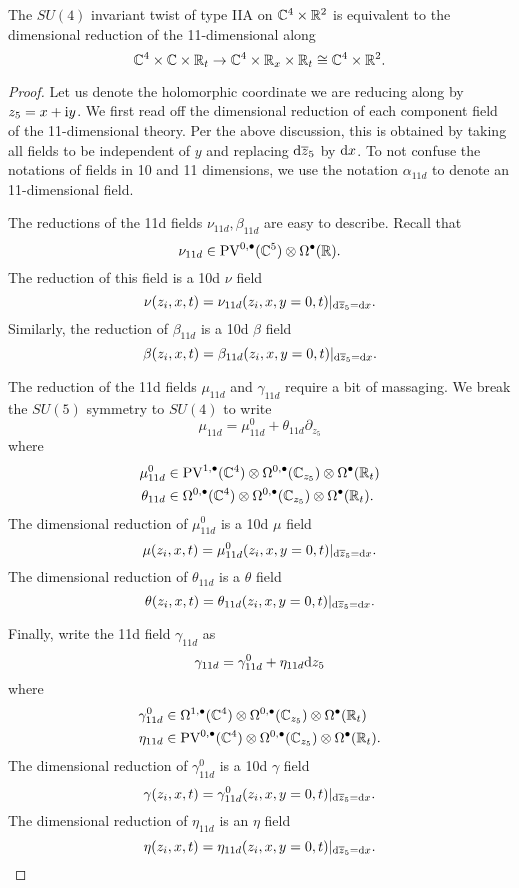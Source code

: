 \begin{prop}\label{prop:dimred}
The $SU(4)$ invariant twist of type IIA on $\mathbb C^4 \times \mathbb R^2$ is equivalent to the dimensional reduction of the 11-dimensional along  
\[
\mathbb C^4 \times \mathbb C \times \mathbb R_t \to \mathbb C^4 \times \mathbb R_x \times \mathbb R_t \cong \mathbb C^4 \times \mathbb R^2 .
\]
\end{prop}
\begin{proof}
Let us denote the holomorphic coordinate we are reducing along by $z_5 = x + {\rm i} y$. 
We first read off the dimensional reduction of each component field of the 11-dimensional theory. 
Per the above discussion, this is obtained by taking all fields to be independent of $y$ and replacing ${\rm d} \overline{z}_5$ by ${\rm d} x$. 
To not confuse the notations of fields in 10 and 11 dimensions, we use the notation $\alpha_{11d}$ to denote an 11-dimensional field.

The reductions of the 11d fields $\nu_{11d}, \beta_{11d}$ are easy to describe. 
Recall that 
\[
\nu_{11d} \in {\rm PV}^{0,\bullet}(\mathbb C^5) \otimes \Omega^\bullet(\mathbb R) .
\]
The reduction of this field is a 10d $\nu$ field
\[
\nu (z_i,x,t) = \nu_{11d} (z_i, x, y=0, t) |_{{\rm d} \overline{z}_5 = {\rm d} x}  .
\]
Similarly, the reduction of $\beta_{11d}$ is a 10d $\beta$ field
\[
\beta (z_i,x,t) = \beta_{11d} (z_i, x, y=0, t) |_{{\rm d} \overline{z}_5 = {\rm d} x}  .
\]

The reduction of the 11d fields $\mu_{11d}$ and $\gamma_{11d}$ require a bit of massaging. 
We break the $SU(5)$ symmetry to $SU(4)$ to write
\[
\mu_{11d} = \mu^0_{11d} + \theta_{11d} \partial_{z_5} 
\]
where
\begin{align*}
\mu^0_{11d} & \in {\rm PV}^{1,\bullet}(\mathbb C^4) \otimes \Omega^{0,\bullet}(\mathbb C_{z_5}) \otimes \Omega^\bullet(\mathbb R_t) \\
\theta_{11d} & \in \Omega^{0,\bullet}(\mathbb C^4) \otimes \Omega^{0,\bullet}(\mathbb C_{z_5}) \otimes \Omega^\bullet(\mathbb R_t) .
\end{align*}
The dimensional reduction of $\mu^0_{11d}$ is a 10d $\mu$ field
\[
\mu(z_i,x,t) = \mu_{11d}^0 (z_i, x,y=0,t)|_{{\rm d} \overline{z}_5 = {\rm d} x} .
\]
The dimensional reduction of $\theta_{11d}$ is a $\theta$ field
\[
\theta(z_i,x,t) = \theta_{11d} (z_i, x,y=0,t)|_{{\rm d} \overline{z}_5 = {\rm d} x} .
\]

Finally, write the 11d field $\gamma_{11d}$ as
\[
\gamma_{11d} = \gamma_{11d}^0 + \eta_{11d} {\rm d} z_5
\]
where
\begin{align*}
\gamma^0_{11d} & \in \Omega^{1,\bullet}(\mathbb C^4) \otimes \Omega^{0,\bullet}(\mathbb C_{z_5}) \otimes \Omega^\bullet(\mathbb R_t) \\
\eta_{11d} & \in {\rm PV}^{0,\bullet}(\mathbb C^4) \otimes \Omega^{0,\bullet}(\mathbb C_{z_5}) \otimes \Omega^\bullet(\mathbb R_t) .
\end{align*}
The dimensional reduction of $\gamma^0_{11d}$ is a 10d $\gamma$ field
\[
\gamma(z_i,x,t) = \gamma_{11d}^0 (z_i, x,y=0,t)|_{{\rm d} \overline{z}_5 = {\rm d} x} .
\]
The dimensional reduction of $\eta_{11d}$ is an $\eta$ field
\[
\eta(z_i,x,t) = \eta_{11d} (z_i, x,y=0,t)|_{{\rm d} \overline{z}_5 = {\rm d} x} .
\]


\end{proof}
